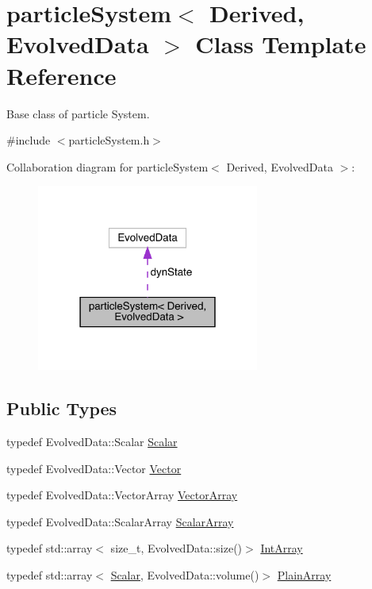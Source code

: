\hypertarget{classparticle_system}{}\section{particle\+System$<$ Derived, Evolved\+Data $>$ Class Template Reference}
\label{classparticle_system}


Base class of particle System.  




{\ttfamily \#include $<$particle\+System.\+h$>$}



Collaboration diagram for particle\+System$<$ Derived, Evolved\+Data $>$\+:\nopagebreak
\begin{figure}[H]
\begin{center}
\leavevmode
\includegraphics[width=207pt]{classparticle_system__coll__graph}
\end{center}
\end{figure}
\subsection*{Public Types}
\begin{DoxyCompactItemize}
\item 
typedef Evolved\+Data\+::\+Scalar \mbox{\hyperlink{classparticle_system_a28e49da72c0ca5786d0611e6128a8994}{Scalar}}
\item 
typedef Evolved\+Data\+::\+Vector \mbox{\hyperlink{classparticle_system_ab7ee6005b0bed27658db2fa983def5ec}{Vector}}
\item 
typedef Evolved\+Data\+::\+Vector\+Array \mbox{\hyperlink{classparticle_system_a6f66ed187a286c0d42ab2f83b8b6193b}{Vector\+Array}}
\item 
typedef Evolved\+Data\+::\+Scalar\+Array \mbox{\hyperlink{classparticle_system_af7f328120ff85c8b34edeed4a68b746e}{Scalar\+Array}}
\item 
typedef std\+::array$<$ size\+\_\+t, Evolved\+Data\+::size()$>$ \mbox{\hyperlink{classparticle_system_aee9dc82f46ce17a477251805094cf19f}{Int\+Array}}
\item 
typedef std\+::array$<$ \mbox{\hyperlink{classparticle_system_a28e49da72c0ca5786d0611e6128a8994}{Scalar}}, Evolved\+Data\+::volume()$>$ \mbox{\hyperlink{classparticle_system_ae5a7215810a9f2cad5508aca6b26a063}{Plain\+Array}}
\end{DoxyCompactItemize}
